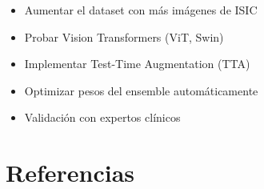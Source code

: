 \documentclass[12pt,a4paper]{article}
\begin{document}
\begin{itemize}
    \item Aumentar el dataset con más imágenes de ISIC
    \item Probar Vision Transformers (ViT, Swin)
    \item Implementar Test-Time Augmentation (TTA)
    \item Optimizar pesos del ensemble automáticamente
    \item Validación con expertos clínicos
\end{itemize}

\newpage

\section*{Referencias}
\newpage


\end{document}

